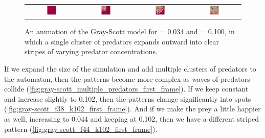 \begin{figure}[h]
\centering
\mySfFamily
\begin{tabular}{c c c c}
\includegraphics[width = 0.2\textwidth]{../images/gs_f038_k100_Moment_1.png} & \includegraphics[width = 0.2\textwidth]{../images/gs_f038_k100_Moment_2.png} & \includegraphics[width = 0.2\textwidth]{../images/gs_f038_k100_Moment_3.png} & \includegraphics[width = 0.2\textwidth]{../images/gs_f038_k100_Moment_4.png}
\end{tabular}
\caption{An animation of the Gray-Scott model for  = 0.034 and  = 0.100, in which a single cluster of predators expands outward into clear stripes of varying predator concentrations.}
\label{fig:gray-scott_movie_first_frame}
\end{figure}

If we expand the size of the simulation and add multiple clusters of predators to the automaton, then the patterns become more complex as waves of predators collide (\autoref{fig:gray-scott_multiple_predators_first_frame}). If we keep  constant and increase  slightly to 0.102, then the patterns change significantly into spots (\autoref{fig:gray-scott_f38_k102_first_frame}). And if we make the prey a little happier as well, increasing   to 0.044 and keeping  at 0.102, then we have a different striped pattern (\autoref{fig:gray-scott_f44_k102_first_frame}).\\

